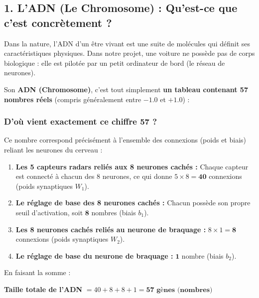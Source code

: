 \documentclass[12pt,a4paper]{article}
\begin{document}
\subsection{1. L'ADN (Le Chromosome) : Qu'est-ce que c'est concrètement ?}
Dans la nature, l'ADN d'un être vivant est une suite de molécules qui définit ses caractéristiques physiques. Dans notre projet, une voiture ne possède pas de corps biologique : elle est pilotée par un petit ordinateur de bord (le réseau de neurones).

Son \textbf{ADN (Chromosome)}, c'est tout simplement \textbf{un tableau contenant 57 nombres réels} (compris généralement entre $-1.0$ et $+1.0$) :
\begin{center}
\end{center}

\subsubsection{D'où vient exactement ce chiffre 57 ?}
Ce nombre correspond précisément à l'ensemble des connexions (poids et biais) reliant les neurones du cerveau :
\begin{enumerate}
  \item \textbf{Les 5 capteurs radars reliés aux 8 neurones cachés :} Chaque capteur est connecté à chacun des 8 neurones, ce qui donne $5 \times 8 = \mathbf{40}$ connexions (poids synaptiques $W_1$).
  \item \textbf{Le réglage de base des 8 neurones cachés :} Chacun possède son propre seuil d'activation, soit $\mathbf{8}$ nombres (biais $b_1$).
  \item \textbf{Les 8 neurones cachés reliés au neurone de braquage :} $8 \times 1 = \mathbf{8}$ connexions (poids synaptiques $W_2$).
  \item \textbf{Le réglage de base du neurone de braquage :} $\mathbf{1}$ nombre (biais $b_2$).
\end{enumerate}
En faisant la somme :
\begin{center}
\textbf{Taille totale de l'ADN} $= 40 + 8 + 8 + 1 = \mathbf{57 \text{ gènes (nombres)}}$
\end{center}
\end{document}
